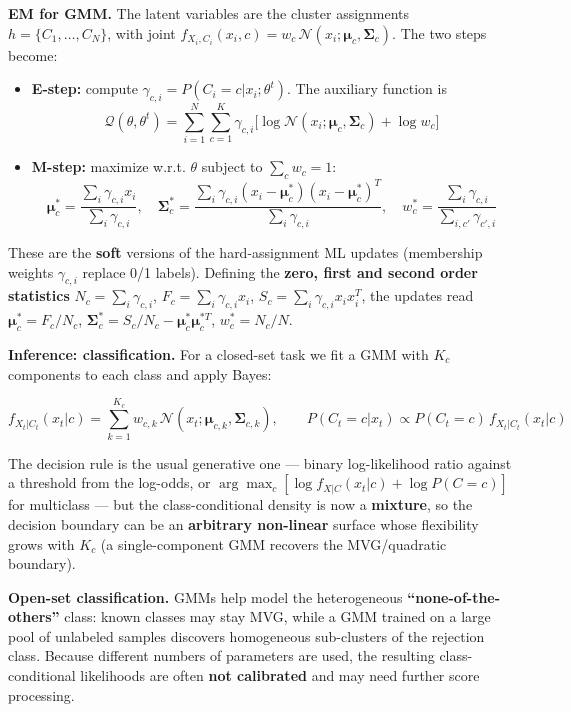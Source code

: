 \textbf{EM for GMM.} The latent variables are the cluster assignments $h=\{C_1,\dots,C_N\}$, with joint $f_{X_i,C_i}(x_i,c)=w_c\,\mathcal{N}(x_i;\boldsymbol{\mu}_c,\boldsymbol{\Sigma}_c)$. The two steps become:

\begin{itemize}
\item \textbf{E-step:} compute $\gamma_{c,i}=P(C_i=c|x_i;\theta^t)$. The auxiliary function is
$$\mathcal{Q}(\theta,\theta^t)=\sum_{i=1}^N\sum_{c=1}^K \gamma_{c,i}\big[\log\mathcal{N}(x_i;\boldsymbol{\mu}_c,\boldsymbol{\Sigma}_c)+\log w_c\big]$$
\item \textbf{M-step:} maximize w.r.t. $\theta$ subject to $\sum_c w_c = 1$:
$$\boldsymbol{\mu}_c^* = \frac{\sum_i \gamma_{c,i}x_i}{\sum_i \gamma_{c,i}}, \quad \boldsymbol{\Sigma}_c^* = \frac{\sum_i \gamma_{c,i}(x_i-\boldsymbol{\mu}_c^*)(x_i-\boldsymbol{\mu}_c^*)^T}{\sum_i \gamma_{c,i}}, \quad w_c^* = \frac{\sum_i \gamma_{c,i}}{\sum_{i,c'} \gamma_{c',i}}$$
\end{itemize}

These are the \textbf{soft} versions of the hard-assignment ML updates (membership weights $\gamma_{c,i}$ replace 0/1 labels). Defining the \textbf{zero, first and second order statistics} $N_c=\sum_i\gamma_{c,i}$, $F_c=\sum_i\gamma_{c,i}x_i$, $S_c=\sum_i\gamma_{c,i}x_ix_i^T$, the updates read $\boldsymbol{\mu}_c^*=F_c/N_c$, $\boldsymbol{\Sigma}_c^*=S_c/N_c-\boldsymbol{\mu}_c^*\boldsymbol{\mu}_c^{*T}$, $w_c^*=N_c/N$.

\textbf{Inference: classification.} For a closed-set task we fit a GMM with $K_c$ components to each class and apply Bayes:

$$f_{X_t|C_t}(x_t|c)=\sum_{k=1}^{K_c} w_{c,k}\,\mathcal{N}(x_t;\boldsymbol{\mu}_{c,k},\boldsymbol{\Sigma}_{c,k}), \qquad P(C_t=c|x_t)\propto P(C_t=c)\,f_{X_t|C_t}(x_t|c)$$

The decision rule is the usual generative one — binary log-likelihood ratio against a threshold from the log-odds, or $\arg\max_c[\log f_{X|C}(x_t|c)+\log P(C=c)]$ for multiclass — but the class-conditional density is now a \textbf{mixture}, so the decision boundary can be an \textbf{arbitrary non-linear} surface whose flexibility grows with $K_c$ (a single-component GMM recovers the MVG/quadratic boundary).

\textbf{Open-set classification.} GMMs help model the heterogeneous \textbf{``none-of-the-others''} class: known classes may stay MVG, while a GMM trained on a large pool of unlabeled samples discovers homogeneous sub-clusters of the rejection class. Because different numbers of parameters are used, the resulting class-conditional likelihoods are often \textbf{not calibrated} and may need further score processing.

